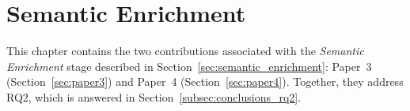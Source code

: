 \chapter{Semantic Enrichment}
\label{chap:semantic_enrichment}

This chapter contains the two contributions associated with the \emph{Semantic Enrichment} stage described in Section~\ref{sec:semantic_enrichment}: Paper~3 (Section~\ref{sec:paper3}) and Paper~4 (Section~\ref{sec:paper4}). Together, they address RQ2, which is answered in Section~\ref{subsec:conclusions_rq2}.




